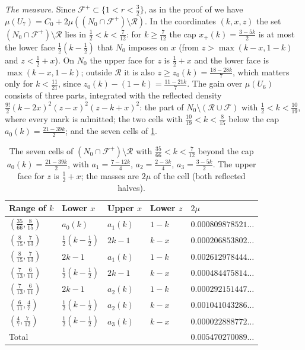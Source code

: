 \documentclass[11pt,colorlinks]{charlie}
\begin{document}
\emph{The measure.} Since $\mathcal F^+\subset\{1<r<\frac32\}$, as in the proof of  we have $\mu(U_7)=C_0+2\mu((N_0\cap\mathcal F^+)\setminus\mathcal R)$. In the coordinates $(k,x,z)$ the set $(N_0\cap\mathcal F^+)\setminus\mathcal R$ lies in $\frac12<k<\frac7{12}$: for $k\ge\frac7{12}$ the cap $x_+(k)=\frac{3-5k}2$ is at most the lower face $\frac12(k-\frac12)$ that $N_0$ imposes on $x$ (from $z>\max(k-x,1-k)$ and $z<\frac12+x$). On $N_0$ the upper face for $z$ is $\frac12+x$ and the lower face is $\max(k-x,1-k)$; outside $\mathcal R$ it is also $z\ge z_0(k)=\frac{18-28k}7$, which matters only for $k<\frac{11}{21}$, since $z_0(k)-(1-k)=\frac{11-21k}7$. The gain over $\mu(U_6)$ consists of three parts, integrated with the reflected density $\frac{9!}2(k-2x)^2(z-x)^2(z-k+x)^2$: the part of $N_0\setminus(\mathcal R\cup\mathcal F)$ with $\frac12<k<\frac{10}{19}$, where every mark is admitted; the two cells with $\frac{10}{19}<k<\frac8{15}$ below the cap $a_0(k)=\frac{21-39k}2$; and the seven cells of \cref{tab:sevencells}.

\begin{table}[ht]
\centering
\small
\caption{The seven cells of $(N_0\cap\mathcal F^+)\setminus\mathcal R$ with $\frac{35}{66}<k<\frac7{12}$ beyond the cap $a_0(k)=\frac{21-39k}2$, with $a_1=\frac{7-12k}4$, $a_2=\frac{2-3k}4$, $a_3=\frac{3-5k}2$. The upper face for $z$ is $\frac12+x$; the masses are $2\mu$ of the cell (both reflected halves).}\label{tab:sevencells}
\begin{tabular}{@{}lllll@{}}
\toprule
Range of $k$ & Lower $x$ & Upper $x$ & Lower $z$ & $2\mu$ \\
\midrule
$(\frac{35}{66},\frac8{15})$ & $a_0(k)$ & $a_1(k)$ & $1-k$ & $0.000809878521\ldots$ \\
$(\frac8{15},\frac7{13})$ & $\frac12(k-\frac12)$ & $2k-1$ & $k-x$ & $0.000206853802\ldots$ \\
$(\frac8{15},\frac7{13})$ & $2k-1$ & $a_1(k)$ & $1-k$ & $0.002612978444\ldots$ \\
$(\frac7{13},\frac6{11})$ & $\frac12(k-\frac12)$ & $2k-1$ & $k-x$ & $0.000484475814\ldots$ \\
$(\frac7{13},\frac6{11})$ & $2k-1$ & $a_2(k)$ & $1-k$ & $0.000292151447\ldots$ \\
$(\frac6{11},\frac47)$ & $\frac12(k-\frac12)$ & $a_2(k)$ & $k-x$ & $0.001041043286\ldots$ \\
$(\frac47,\frac7{12})$ & $\frac12(k-\frac12)$ & $a_3(k)$ & $k-x$ & $0.000022888772\ldots$ \\
\midrule
Total & & & & $0.005470270089\ldots$ \\
\bottomrule
\end{tabular}
\end{table}
\end{document}
